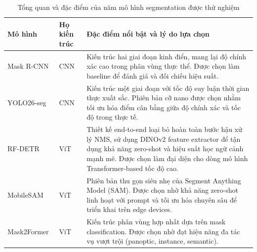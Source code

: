 \begin{table}[htbp]
    \centering
    \caption{Tổng quan và đặc điểm của năm mô hình segmentation được thử nghiệm}
    \label{tab:model_overview}
    \begin{tabular}{llp{9.5cm}}
        \toprule
        \textbf{Mô hình}     & \textbf{Họ kiến trúc} & \textbf{Đặc điểm nổi bật và lý do lựa chọn}                                                                                                                                                                                        \\
        \midrule
        Mask R-CNN~\cite{he2017mask}  & CNN          & Kiến trúc hai giai đoạn kinh điển, mang lại độ chính xác cao trong phân vùng thực thể. Được chọn làm baseline để đánh giá và đối chiếu hiệu suất.                                                                                  \\
        YOLO26-seg~\cite{jocher2023ultralytics, jocher2024yolo} & CNN          & Kiến trúc một giai đoạn với tốc độ suy luận thời gian thực xuất sắc. Phiên bản cỡ nano được chọn nhằm tối ưu hóa điểm cân bằng giữa độ chính xác và tốc độ trong thực tế.                                                        \\
        RF-DETR~\cite{roboflow2024rfdetr, lv2023detrs}     & ViT          & Thiết kế end-to-end loại bỏ hoàn toàn bước hậu xử lý NMS, sử dụng DINOv2 feature extractor để tận dụng khả năng zero-shot và hiệu suất học ngữ cảnh mạnh mẽ. Được chọn làm đại diện cho dòng mô hình Transformer-based tốc độ cao. \\
        MobileSAM~\cite{zhang2023mobilesam, zhang2023faster}   & ViT          & Phiên bản thu gọn siêu nhẹ của Segment Anything Model (SAM). Được chọn nhờ khả năng zero-shot linh hoạt với prompt và tối ưu hóa chuyên sâu để triển khai trên edge devices.                                                       \\
        Mask2Former~\cite{cheng2022masked} & ViT          & Kiến trúc phân vùng hợp nhất dựa trên mask classification. Được chọn nhờ đạt hiệu năng đa tác vụ vượt trội (panoptic, instance, semantic).                                                                                         \\
        \bottomrule
    \end{tabular}
\end{table}

